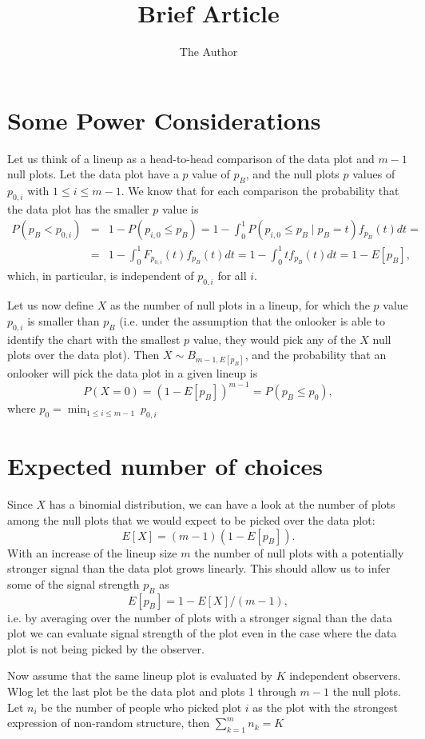 \documentclass[11pt]{article}
\title{Brief Article}
\author{The Author}
\begin{document}
\section{Some Power Considerations}

Let us think of a lineup as a head-to-head comparison of the data plot and $m-1$ null plots. Let the data plot have a $p$ value of $p_B$, and the null plots $p$ values of $p_{0, i}$ with $1 \le i \le m-1$.
We know that for each comparison the probability that the data plot has the smaller $p$ value is 
\begin{eqnarray*}
P(p_B < p_{0,i}) &=& 1 - P(p_{i,0} \le p_B) = 1- \int_0^1  P(p_{i,0} \le p_B \mid p_B=t) f_{p_B}(t) dt =  \\
&=& 1 - \int_0^1 F_{p_{0,i}}(t) f_{p_B}(t) dt = 1 - \int_0^1 t f_{p_B}(t) dt = 1 - E[p_B],
\end{eqnarray*}
which, in particular, is independent of $p_{0,i}$ for all $i$.

Let us now define $X$ as the number of null plots in a lineup, for which the $p$ value $p_{0,i}$ is smaller than $p_B$ (i.e. under the assumption that the onlooker is able to identify the chart with the smallest $p$ value, they would pick any of the $X$  null plots over the data plot). 
Then $X \sim B_{m-1, E[p_B]}$, and the probability that an onlooker will pick the data plot in a given lineup is 
\[
P(X=0) = \left(1 - E[p_B] \right)^{m-1} = P(p_B \le p_0),
\]
where $p_0 = \min_{1 \le i \le m-1}  \ p_{0,i}$

\section{Expected number of choices}
Since $X$ has a binomial distribution, we can have a look at the number of plots among the null plots that we would expect to be picked over the data plot:
\[
E[X] = (m-1)(1-E[p_B]).
\]
With an increase of the lineup size $m$ the number of null plots with a potentially stronger signal than the data plot grows linearly.
This should allow us to infer some of the signal strength $p_B$ as
\[
E[p_B] = 1 - E[X]/(m-1),
\]
i.e. by averaging over the number of plots with  a stronger signal than the data plot we can evaluate signal strength of the plot even in the case where the data plot is not being picked by the observer.

Now assume that the same lineup plot is evaluated by $K$ independent observers. Wlog let the last plot be the data plot and plots 1 through $m-1$ the null plots. Let $n_i$ be the number of people who picked plot $i$ as the plot with the strongest expression of non-random structure, then $\sum_{k=1}^{m} n_k = K$
\end{document}
